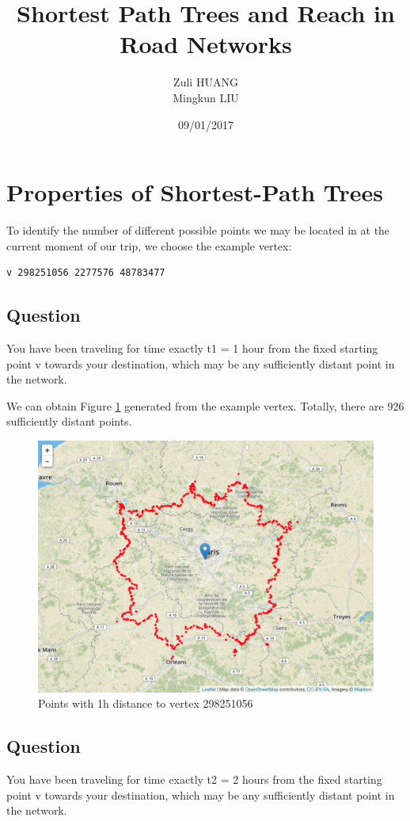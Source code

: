 \documentclass[titlepage,11pt,a4paper]{article}
\title[INF 421 Programming Project]{Shortest Path Trees and Reach in Road Networks}
\author{Zuli \textsc{HUANG}\\
            Mingkun \textsc{LIU}
            }
\date{09/01/2017}
\begin{document}
\maketitle

\section{Properties of Shortest-Path Trees}
To identify the number of different possible points we may be located in at the current moment of our trip, we choose the example vertex:
\begin{verbatim}
v 298251056 2277576 48783477
\end{verbatim}

\subsection{Question}{You have been traveling for time exactly t1 = 1 hour from the fixed starting point v towards your destination, which may be any sufficiently distant point in the network.}

We can obtain Figure \ref{fig:questioin_1.1_out} generated from the example vertex. Totally, there are 926 sufficiently distant points.
\begin{figure}[h]
    \centering
    \includegraphics[width=\textwidth]{map_Q1.1.png}
    \caption{Points with 1h distance to vertex 298251056}
    \label{fig:questioin_1.1_out}
\end{figure}

\subsection{Question}{You have been traveling for time exactly t2 = 2 hours from the fixed starting point v towards your destination, which may be any sufficiently distant point in the network.}
\end{document}
